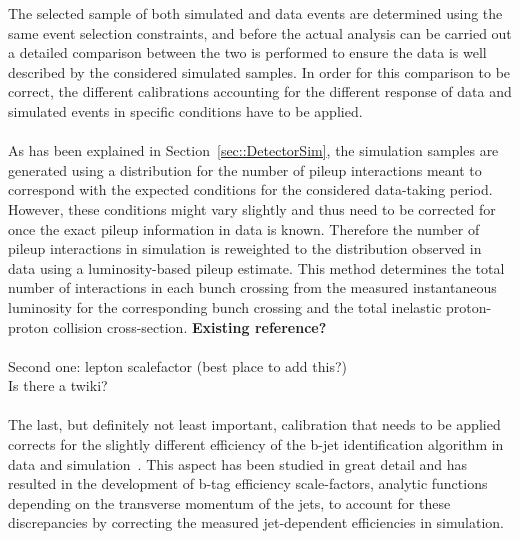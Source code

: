 The selected sample of both simulated and data events are determined using the same event selection constraints, and before the actual analysis can be carried out a detailed comparison between the two is performed to ensure the data is well described by the considered simulated samples.
In order for this comparison to be correct, the different calibrations accounting for the different response of data and simulated events in specific conditions have to be applied.
\\
\\
As has been explained in Section~\ref{sec::DetectorSim}, the simulation samples are generated using a distribution for the number of pileup interactions meant to correspond with the expected conditions for the considered data-taking period. However, these conditions might vary slightly and thus need to be corrected for once the exact pileup information in data is known.
Therefore the number of pileup interactions in simulation is reweighted to the distribution observed in data using a luminosity-based pileup estimate.
This method determines the total number of interactions in each bunch crossing from the measured instantaneous luminosity for the corresponding bunch crossing and the total inelastic proton-proton collision cross-section. \textbf{Existing reference?}
\\
\\
Second one: lepton scalefactor (best place to add this?)\\
Is there a twiki?
\\
\\
The last, but definitely not least important, calibration that needs to be applied corrects for the slightly different efficiency of the b-jet identification algorithm in data and simulation~\cite{BTagSF}.
This aspect has been studied in great detail and has resulted in the development of b-tag efficiency scale-factors, analytic functions depending on the transverse momentum of the jets, to account for these discrepancies by correcting the measured jet-dependent efficiencies in simulation.
